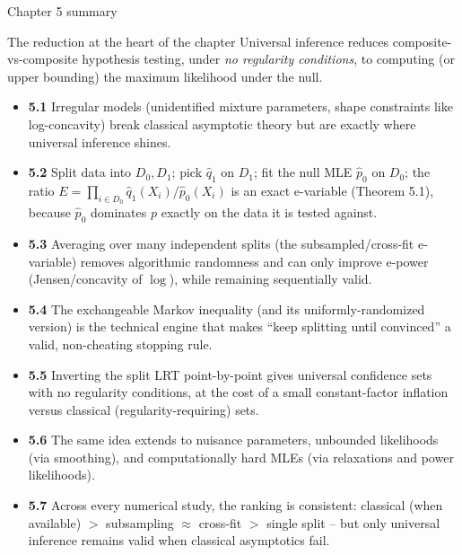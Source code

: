 \documentclass[aspectratio=169,10pt]{beamer}
\begin{document}
\begin{frame}[allowframebreaks]{Chapter 5 summary}

  \begin{block}{The reduction at the heart of the chapter}
    Universal inference reduces composite-vs-composite hypothesis
    testing, under \emph{no regularity conditions}, to computing (or
    upper bounding) the maximum likelihood under the null.
  \end{block}

  \begin{itemize}
    \item \textbf{5.1} Irregular models (unidentified mixture
      parameters, shape constraints like log-concavity) break classical
      asymptotic theory but are exactly where universal inference
      shines.
    \item \textbf{5.2} Split data into $D_0, D_1$; pick $\hat q_1$ on
      $D_1$; fit the null MLE $\hat p_0$ on $D_0$; the ratio
      $E = \prod_{i\in D_0} \hat q_1(X_i)/\hat p_0(X_i)$ is an exact
      e-variable (Theorem 5.1), because $\hat p_0$ dominates $p$
      exactly on the data it is tested against.
    \item \textbf{5.3} Averaging over many independent splits (the
      subsampled/cross-fit e-variable) removes algorithmic randomness
      and can only improve e-power (Jensen/concavity of $\log$), while
      remaining sequentially valid.
    \item \textbf{5.4} The exchangeable Markov inequality (and its
      uniformly-randomized version) is the technical engine that makes
      ``keep splitting until convinced'' a valid, non-cheating stopping
      rule.
    \item \textbf{5.5} Inverting the split LRT point-by-point gives
      universal confidence sets with no regularity conditions, at the
      cost of a small constant-factor inflation versus classical
      (regularity-requiring) sets.
    \item \textbf{5.6} The same idea extends to nuisance parameters,
      unbounded likelihoods (via smoothing), and computationally hard
      MLEs (via relaxations and power likelihoods).
    \item \textbf{5.7} Across every numerical study, the ranking is
      consistent: classical (when available) $>$ subsampling $\approx$
      cross-fit $>$ single split -- but only universal inference remains
      valid when classical asymptotics fail.
  \end{itemize}

\end{frame}
\end{document}
